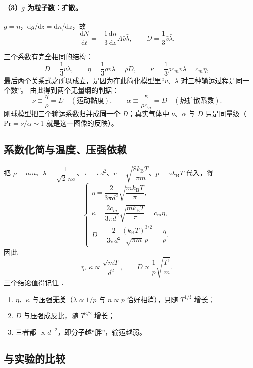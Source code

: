 \documentclass[11pt,a4paper,openany]{ctexbook}
\newcommand{\dd}{\mathrm d}
\newcommand{\kBT}{k_{\mathrm B}T}
\begin{document}
\paragraph{（3）$g$ 为粒子数：扩散。}
$g=n$，$\dd g/\dd z=\dd n/\dd z$，故
\[
\frac{\dd N}{\dd t}=-\frac13\frac{\dd n}{\dd z}A\bar v\bar\lambda,
\qquad
\boxed{D=\frac13\bar v\bar\lambda}.
\]

\begin{keybox}
三个系数有完全相同的结构：
\[
D=\frac13\bar v\bar\lambda,\qquad
\eta=\frac13\rho\bar v\bar\lambda=\rho D,\qquad
\kappa=\frac13\rho c_m\bar v\bar\lambda=c_m\eta,
\]
最后两个关系式之所以成立，是因为在此简化模型里“$\bar v$、$\bar\lambda$ 对三种输运过程是同一个数”。
由此得到两个无量纲的判据：
\[
\nu\equiv\frac{\eta}{\rho}=D\quad(\text{运动黏度}),
\qquad
\alpha\equiv\frac{\kappa}{\rho c_m}=D\quad(\text{热扩散系数}).
\]
刚球模型把三个输运系数归并成\textbf{同一个} $D$；真实气体中 $\nu$、$\alpha$ 与 $D$ 只是同量级（$\mathrm{Pr}=\nu/\alpha\sim1$ 就是这一图像的反映）。
\end{keybox}

\subsection*{系数化简与温度、压强依赖}

把 $\rho=nm$、$\bar\lambda=\dfrac{1}{\sqrt2\,n\sigma}$、$\sigma=\pi d^2$、$\bar v=\sqrt{\dfrac{8\kBT}{\pi m}}$、$p=n\kBT$ 代入，得
\[
\begin{cases}
\eta=\dfrac{2}{3\pi d^2}\sqrt{\dfrac{m\kBT}{\pi}},\\[3mm]
\kappa=\dfrac{2c_m}{3\pi d^2}\sqrt{\dfrac{m\kBT}{\pi}}=c_m\eta,\\[3mm]
D=\dfrac{2}{3\pi d^2}\dfrac{(\kBT)^{3/2}}{\sqrt{\pi m}\,p}=\dfrac{\eta}{\rho}.
\end{cases}
\]
因此
\[
\boxed{\eta,\ \kappa\propto\frac{\sqrt{mT}}{d^2}},
\qquad
\boxed{D\propto\frac{1}{p}\sqrt{\frac{T^3}{m}}} .
\]
三个结论值得记住：
\begin{enumerate}[leftmargin=1.8em,itemsep=1pt]
\item $\eta$、$\kappa$ 与压强\textbf{无关}（$\bar\lambda\propto1/p$ 与 $n\propto p$ 恰好相消），只随 $T^{1/2}$ 增长；
\item $D$ 与压强成反比，随 $T^{3/2}$ 增长；
\item 三者都 $\propto d^{-2}$，即分子越“胖”，输运越弱。
\end{enumerate}

\subsection*{与实验的比较}
\end{document}
